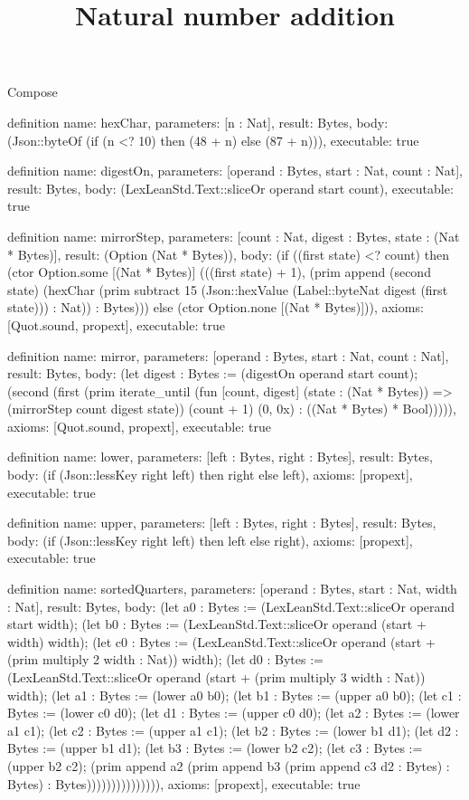 \begin{lexlean}{Compose}
\title{Natural number addition}
\begin{semanticmodule}
definition{
  name: hexChar,
  parameters: [n : Nat],
  result: Bytes,
  body: (Json::byteOf (if (n <? 10) then (48 + n) else (87 + n))),
  executable: true
}

definition{
  name: digestOn,
  parameters: [operand : Bytes, start : Nat, count : Nat],
  result: Bytes,
  body: (LexLeanStd.Text::sliceOr operand start count),
  executable: true
}

definition{
  name: mirrorStep,
  parameters: [count : Nat, digest : Bytes, state : (Nat * Bytes)],
  result: (Option (Nat * Bytes)),
  body: (if ((first state) <? count) then (ctor Option.some [(Nat * Bytes)] (((first state) + 1), (prim append (second state) (hexChar (prim subtract 15 (Json::hexValue (Label::byteNat digest (first state))) : Nat)) : Bytes))) else (ctor Option.none [(Nat * Bytes)])),
  axioms: [Quot.sound, propext],
  executable: true
}

definition{
  name: mirror,
  parameters: [operand : Bytes, start : Nat, count : Nat],
  result: Bytes,
  body: (let digest : Bytes := (digestOn operand start count); (second (first (prim iterate_until (fun [count, digest] (state : (Nat * Bytes)) => (mirrorStep count digest state)) (count + 1) (0, 0x) : ((Nat * Bytes) * Bool))))),
  axioms: [Quot.sound, propext],
  executable: true
}

definition{
  name: lower,
  parameters: [left : Bytes, right : Bytes],
  result: Bytes,
  body: (if (Json::lessKey right left) then right else left),
  axioms: [propext],
  executable: true
}

definition{
  name: upper,
  parameters: [left : Bytes, right : Bytes],
  result: Bytes,
  body: (if (Json::lessKey right left) then left else right),
  axioms: [propext],
  executable: true
}

definition{
  name: sortedQuarters,
  parameters: [operand : Bytes, start : Nat, width : Nat],
  result: Bytes,
  body: (let a0 : Bytes := (LexLeanStd.Text::sliceOr operand start width); (let b0 : Bytes := (LexLeanStd.Text::sliceOr operand (start + width) width); (let c0 : Bytes := (LexLeanStd.Text::sliceOr operand (start + (prim multiply 2 width : Nat)) width); (let d0 : Bytes := (LexLeanStd.Text::sliceOr operand (start + (prim multiply 3 width : Nat)) width); (let a1 : Bytes := (lower a0 b0); (let b1 : Bytes := (upper a0 b0); (let c1 : Bytes := (lower c0 d0); (let d1 : Bytes := (upper c0 d0); (let a2 : Bytes := (lower a1 c1); (let c2 : Bytes := (upper a1 c1); (let b2 : Bytes := (lower b1 d1); (let d2 : Bytes := (upper b1 d1); (let b3 : Bytes := (lower b2 c2); (let c3 : Bytes := (upper b2 c2); (prim append a2 (prim append b3 (prim append c3 d2 : Bytes) : Bytes) : Bytes))))))))))))))),
  axioms: [propext],
  executable: true
}


\end{semanticmodule}
\end{lexlean}
